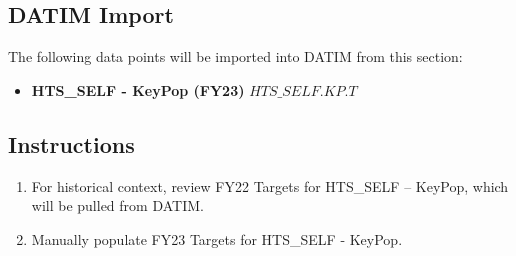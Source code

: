 \documentclass[
  openany]{book}
\providecommand{\tightlist}{%
  \setlength{\itemsep}{0pt}\setlength{\parskip}{0pt}}
\begin{document}
\begin{table}
\centering\begingroup\fontsize{12}{14}\selectfont

\endgroup{}
\end{table}

\hypertarget{datim-import-41}{%
\subsection{DATIM Import}\label{datim-import-41}}

The following data points will be imported into DATIM from this section:

\begin{itemize}
\tightlist
\item
  \textbf{HTS\_SELF - KeyPop (FY23)} \(HTS\_SELF.KP.T\)
\end{itemize}

\hypertarget{instructions-41}{%
\subsection{Instructions}\label{instructions-41}}

\begin{enumerate}
\def\labelenumi{\arabic{enumi}.}
\item
  For historical context, review FY22 Targets for HTS\_SELF -- KeyPop,
  which will be pulled from DATIM.
\item
  Manually populate FY23 Targets for HTS\_SELF - KeyPop.
\end{enumerate}
\end{document}
